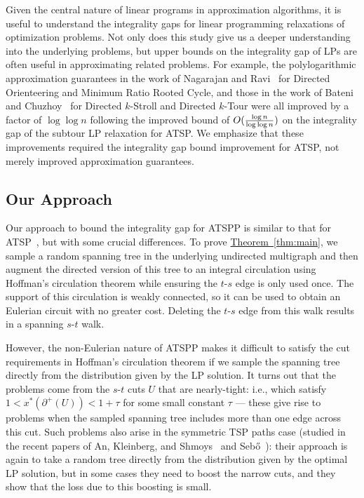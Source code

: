 \documentclass[11pt]{article}
\newcommand{\lref}[2][]{\hyperref[#2]{#1~\ref*{#2}}}
\theoremstyle{definition}
\newcommand{\factor}{\ensuremath{O(\smash{\frac{\log n}{\log\log n}})}}
\begin{document}
Given the central nature of linear programs in approximation algorithms,
it is useful to understand the integrality gaps for linear programming
relaxations of optimization problems. Not only does this study give us a
deeper understanding into the underlying problems, but upper bounds
on the integrality gap of LPs are often useful in approximating related problems.
For example, the polylogarithmic approximation guarantees in
the work of Nagarajan and Ravi~\cite{NR07} for Directed Orienteering and
Minimum Ratio Rooted Cycle, and those in the work of Bateni and
Chuzhoy~\cite{BC10} for Directed $k$-Stroll and Directed $k$-Tour were
all improved by a factor of $\log\log n$ following the improved bound of
$\factor$ on the integrality gap of the subtour LP relaxation for ATSP.
We emphasize that these improvements required the integrality gap
bound improvement for ATSP, not merely improved approximation guarantees.



\subsection{Our Approach}
\label{sec:approach}


Our approach to bound the integrality gap for ATSPP is similar to that
for ATSP~\cite{AGMSS,GS11}, but with some crucial differences.
To prove \lref[Theorem]{thm:main}, we sample a
random spanning tree in the underlying undirected multigraph
and then augment the directed version of this tree
to an integral circulation using Hoffman's circulation theorem while
ensuring the $t$-$s$ edge is only used once. The support of this circulation
is weakly connected, so it can be used to obtain an Eulerian circuit with no greater cost.
Deleting the $t$-$s$ edge from this walk results in a spanning $s$-$t$ walk.

However, the non-Eulerian nature of ATSPP makes it difficult
to satisfy the cut requirements in Hoffman's circulation theorem if we
sample the spanning tree directly from the distribution given by the LP
solution. It turns out that the problems come from the $s$-$t$ cuts $U$
that are nearly-tight: i.e., which satisfy $1 < x^*(\partial^+(U)) <
1+\tau$ for some small constant $\tau$ --- these give rise to problems
when the sampled spanning tree includes more than one edge across this
cut. Such problems also arise in the symmetric TSP paths case (studied
in the recent papers of An, Kleinberg, and Shmoys~\cite{AKS12} and Seb\H{o}~\cite{Sebo13}): their
approach is again to take a random tree directly from the distribution
given by the optimal LP solution, but in some cases they need to boost
the narrow cuts, and they show that the loss due to this boosting is
small.
\end{document}
